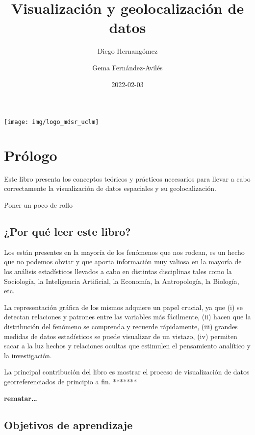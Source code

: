 \documentclass[
]{book}
\title{Visualización y geolocalización de datos}
\author{Diego Hernangómez \and Gema Fernández-Avilés}
\date{2022-02-03}
\theoremstyle{definition}
\theoremstyle{definition}
\theoremstyle{definition}
\theoremstyle{definition}
\theoremstyle{remark}
\begin{document}
\maketitle

{
\setcounter{tocdepth}{1}
\tableofcontents
}
\begin{center}\texttt{[image: img/logo\_mdsr\_uclm]} \end{center}

\hypertarget{pruxf3logo}{%
\chapter*{Prólogo}\label{pruxf3logo}}

Este libro presenta los conceptos teóricos y prácticos necesarios para llevar a
cabo correctamente la visualización de datos espaciales y su geolocalización.

Poner un poco de rollo

\hypertarget{por-quuxe9-leer-este-libro}{%
\section*{¿Por qué leer este libro?}\label{por-quuxe9-leer-este-libro}}

Los  están presentes en la mayoría de los fenómenos
que nos rodean, es un hecho que no podemos obviar y que aporta información muy
valiosa en la mayoría de los análisis estadísticos llevados a cabo en distintas
disciplinas tales como la Sociología, la Inteligencia Artificial, la Economía,
la Antropología, la Biología, etc.

La representación gráfica de los mismos adquiere un papel crucial, ya que (i) se
detectan relaciones y patrones entre las variables más fácilmente, (ii) hacen
que la distribución del fenómeno se comprenda y recuerde rápidamente, (iii)
grandes medidas de datos estadísticos se puede visualizar de un vistazo, (iv)
permiten sacar a la luz hechos y relaciones ocultas que estimulen el pensamiento
analítico y la investigación.

La principal contribución del libro es mostrar el proceso de visualización de
datos georreferenciados de principio a fin. *******

{\textbf{rematar\ldots{}}}

\hypertarget{objetivos-de-aprendizaje}{%
\section*{Objetivos de aprendizaje}\label{objetivos-de-aprendizaje}}
\end{document}
